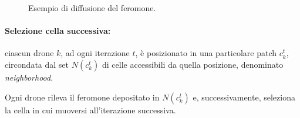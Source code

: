 \begin{figure}[H] 
    \captionsetup{justification=centering, margin=2cm, font=footnotesize}
    \begin{center}
    \end{center}
    \caption{Esempio di diffusione del feromone.}
    \label{diffusione_feromone}
\end{figure}

\paragraph{Selezione cella successiva:} ciascun drone $k$, ad ogni iterazione $t$, è posizionato in una particolare patch $c_{k}^{t}$, circondata dal set $N(c_{k}^{t})$ di celle accessibili da quella posizione, denominato \textit{neighborhood}.

Ogni drone rileva il feromone depositato in $N(c_{k}^{t})$ e, successivamente, seleziona la cella in cui muoversi all'iterazione successiva.

